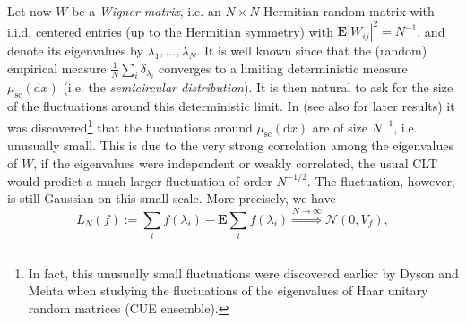 \documentclass[10pt]{amsart}
\numberwithin{equation}{section}
\newcommand{\dif}{\mathrm{d}}
\newcommand{\E}{\mathbf{E}}
\begin{document}
Let now $W$ be a \emph{Wigner matrix}, i.e. an $N\times N$ Hermitian random matrix with i.i.d. centered entries (up to the Hermitian symmetry) with $\E|W_{ij}|^2=N^{-1}$, and denote its eigenvalues by $\lambda_1,\dots, \lambda_N$. It is well known since \cite{wigner1958distribution} that the (random) empirical measure $\frac{1}{N}\sum_i\delta_{\lambda_i}$ converges to a limiting deterministic measure $\mu_{\mathrm{sc}}(\dif x)$ (i.e. the \emph{semicircular distribution}). It is then natural to ask for the size of the fluctuations around this deterministic limit. In \cite{Anderson06, Bai04, Johansson04, Lytova09, Sinai98} (see also \cite{Shcherbina11, Sosoe13} for later results) it was discovered\footnote{In fact, this unusually small fluctuations were discovered earlier by Dyson and Mehta \cite{dyson1963statistical} when studying the fluctuations of the eigenvalues of Haar unitary random matrices (CUE ensemble).} that the fluctuations around $\mu_{\mathrm{sc}}(\dif x)$ are of size $N^{-1}$,  i.e. unusually small. This is due to the very strong correlation among the eigenvalues of $W$, if the eigenvalues were independent or weakly correlated, the usual CLT would predict a much larger fluctuation of order $N^{-1/2}$. The fluctuation, however,  is still Gaussian on this small scale. More precisely, we have
\[
L_N(f):=  \sum_i f(\lambda_i)-\E \sum_i f(\lambda_i)\stackrel{N\to\infty}{\Longrightarrow} \mathcal{N}(0,V_f),
\]
\end{document}
